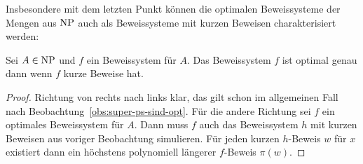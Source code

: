 Insbesondere mit dem letzten Punkt können die optimalen Beweissysteme der Mengen aus $\mathrm{NP}$ auch als Beweissysteme mit kurzen Beweisen charakterisiert werden:
\begin{observation}\label{obs:ps-for-np-optimal}
    Sei $A\in\mathrm{NP}$ und $f$ ein Beweissystem für $A$. Das Beweissystem $f$ ist optimal genau dann wenn $f$ kurze Beweise hat.
\end{observation}
\begin{proof}
    Richtung von rechts nach links klar, das gilt schon im allgemeinen Fall nach Beobachtung~\ref{obs:super-ps-sind-opt}. Für die andere Richtung sei $f$ ein optimales Beweissystem für $A$. Dann muss $f$ auch das Beweissystem $h$ mit kurzen Beweisen aus voriger Beobachtung simulieren. Für jeden kurzen $h$-Beweis $w$ für $x$ existiert dann ein höchstens polynomiell längerer $f$-Beweis $\pi(w)$.
\end{proof}

